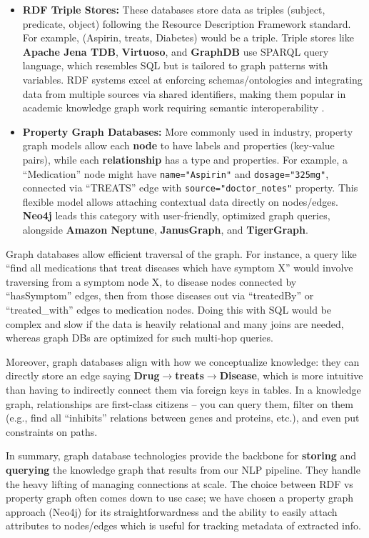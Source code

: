 \begin{itemize}
\item \textbf{RDF Triple Stores:} These databases store data as triples (subject, predicate, object) following the Resource Description Framework standard. For example, (Aspirin, treats, Diabetes) would be a triple. Triple stores like \textbf{Apache Jena TDB}, \textbf{Virtuoso}, and \textbf{GraphDB} use SPARQL query language, which resembles SQL but is tailored to graph patterns with variables. RDF systems excel at enforcing schemas/ontologies and integrating data from multiple sources via shared identifiers, making them popular in academic knowledge graph work requiring semantic interoperability \parencite{Cowell2020}.

\item \textbf{Property Graph Databases:} More commonly used in industry, property graph models allow each \textbf{node} to have labels and properties (key-value pairs), while each \textbf{relationship} has a type and properties. For example, a ``Medication'' node might have \texttt{name="Aspirin"} and \texttt{dosage="325mg"}, connected via ``TREATS'' edge with \texttt{source="doctor\_notes"} property. This flexible model allows attaching contextual data directly on nodes/edges. \textbf{Neo4j} leads this category with user-friendly, optimized graph queries, alongside \textbf{Amazon Neptune}, \textbf{JanusGraph}, and \textbf{TigerGraph}.
\end{itemize}

Graph databases allow efficient traversal of the graph. For instance, a query like ``find all medications that treat diseases which have symptom X'' would involve traversing from a symptom node X, to disease nodes connected by ``hasSymptom'' edges, then from those diseases out via ``treatedBy'' or ``treated\_with'' edges to medication nodes. Doing this with SQL would be complex and slow if the data is heavily relational and many joins are needed, whereas graph DBs are optimized for such multi-hop queries.

Moreover, graph databases align with how we conceptualize knowledge: they can directly store an edge saying \textbf{Drug$\rightarrow$treats$\rightarrow$Disease}, which is more intuitive than having to indirectly connect them via foreign keys in tables. In a knowledge graph, relationships are first-class citizens -- you can query them, filter on them (e.g., find all ``inhibits'' relations between genes and proteins, etc.), and even put constraints on paths.

In summary, graph database technologies provide the backbone for \textbf{storing} and \textbf{querying} the knowledge graph that results from our NLP pipeline. They handle the heavy lifting of managing connections at scale. The choice between RDF vs property graph often comes down to use case; we have chosen a property graph approach (Neo4j) for its straightforwardness and the ability to easily attach attributes to nodes/edges which is useful for tracking metadata of extracted info.

